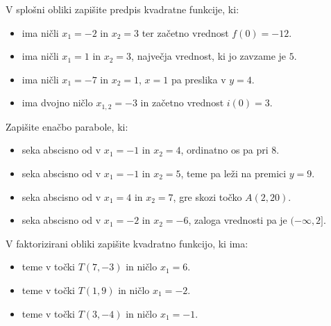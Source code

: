     


    

            \begin{naloga}
                V splošni obliki zapišite predpis kvadratne funkcije, ki:
                                
                    \begin{itemize}
                        \item ima ničli $x_1=-2$ in $x_2=3$ ter začetno vrednost $f(0)=-12$.
                        \item ima ničli $x_1=1$ in $x_2=3$, največja vrednost, ki jo zavzame je $5$.
                        \item ima ničli $x_1=-7$ in $x_2=1$, $x=1$ pa preslika v $y=4$.
                        \item ima dvojno ničlo $x_{1,2}=-3$ in začetno vrednost $i(0)=3$.

                    \end{itemize}

            \end{naloga}


            \begin{naloga}
                Zapišite enačbo parabole, ki:
                
                    \begin{itemize}
                        \item seka abscisno od v $x_1=-1$ in $x_2=4$, ordinatno os pa pri $8$.
                        \item seka abscisno od v $x_1=-1$ in $x_2=5$, teme pa leži na premici $y=9$.
                        \item seka abscisno od v $x_1=4$ in $x_2=7$, gre skozi točko $A(2,20)$.
                        \item seka abscisno od v $x_1=-2$ in $x_2=-6$, zaloga vrednosti pa je $(-\infty,2]$.
                    \end{itemize}

            \end{naloga}

    


    

            \begin{naloga}
                V faktorizirani obliki zapišite kvadratno funkcijo, ki ima:
                                
                    \begin{itemize}
                        \item teme v točki $T(7,-3)$ in ničlo $x_1=6$.
                        \item teme v točki $T(1,9)$ in ničlo $x_1=-2$.
                        \item teme v točki $T(3,-4)$ in ničlo $x_1=-1$.

                    \end{itemize}

            \end{naloga}


